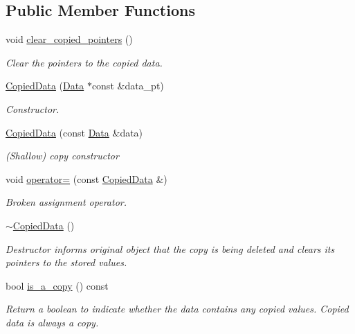\subsection*{Public Member Functions}
\begin{DoxyCompactItemize}
\item 
void \hyperlink{classoomph_1_1CopiedData_a675b1811d9c6b1ba1ce4bbcb7b681245}{clear\+\_\+copied\+\_\+pointers} ()
\begin{DoxyCompactList}\small\item\em Clear the pointers to the copied data. \end{DoxyCompactList}\item 
\hyperlink{classoomph_1_1CopiedData_ab613f17b01f372d5dbe7365cdb8b8819}{Copied\+Data} (\hyperlink{classoomph_1_1Data}{Data} $\ast$const \&data\+\_\+pt)
\begin{DoxyCompactList}\small\item\em Constructor. \end{DoxyCompactList}\item 
\hyperlink{classoomph_1_1CopiedData_a80125e8a22f8de1d26be39fe85a5e207}{Copied\+Data} (const \hyperlink{classoomph_1_1Data}{Data} \&data)
\begin{DoxyCompactList}\small\item\em (Shallow) copy constructor \end{DoxyCompactList}\item 
void \hyperlink{classoomph_1_1CopiedData_a1548a29a62fb5bb646af063a16a110c9}{operator=} (const \hyperlink{classoomph_1_1CopiedData}{Copied\+Data} \&)
\begin{DoxyCompactList}\small\item\em Broken assignment operator. \end{DoxyCompactList}\item 
\hyperlink{classoomph_1_1CopiedData_a3a2a07b9a7c41b687cf32da306cbbb9d}{$\sim$\+Copied\+Data} ()
\begin{DoxyCompactList}\small\item\em Destructor informs original object that the copy is being deleted and clears its pointers to the stored values. \end{DoxyCompactList}\item 
bool \hyperlink{classoomph_1_1CopiedData_ac76cb0c286daa39b501bff9ef82bb05c}{is\+\_\+a\+\_\+copy} () const
\begin{DoxyCompactList}\small\item\em Return a boolean to indicate whether the data contains any copied values. Copied data is always a copy. \end{DoxyCompactList}\item 

\end{DoxyCompactItemize}
